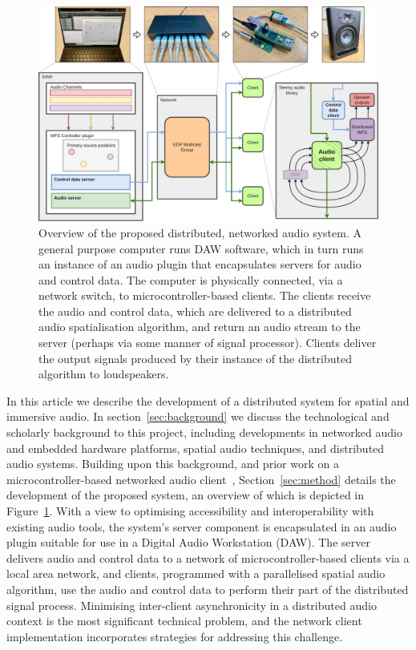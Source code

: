 \documentclass[utf8]{FrontiersinHarvard}
\newcommand{\figref}[1]{Figure~\ref{#1}}
\newcommand{\secref}[1]{section~\ref{#1}}
\newcommand{\Secref}[1]{Section~\ref{#1}}
\begin{document}
    \begin{figure}[ht]
        \centering
        \includegraphics[width=\textwidth]{figures/system_overview}
        \caption{
            Overview of the proposed distributed, networked audio system.
            A general purpose computer runs DAW software, which in turn runs an
            instance of an audio plugin that encapsulates servers for audio and
            control data.
            The computer is physically connected, via a network switch, to
            microcontroller-based clients.
            The clients receive the audio and control data, which are delivered
            to a distributed audio spatialisation algorithm, and return an audio
            stream to the server (perhaps via some manner of signal processor).
            Clients deliver the output signals produced by their instance of the
            distributed algorithm to loudspeakers.
        }
        \label{fig:system-overview}
    \end{figure}

    In this article we describe the development of a distributed system for
    spatial and immersive audio.
    In \secref{sec:background} we discuss the technological and scholarly
    background to this project, including developments in networked audio and
    embedded hardware platforms, spatial audio techniques, and distributed audio
    systems.
    Building upon this background, and prior work on a microcontroller-based
    networked audio client~\citep{rushton_microcontroller-based_2023},
    \Secref{sec:method} details the development of the proposed system, an
    overview of which is depicted in \figref{fig:system-overview}.
    With a view to optimising accessibility and interoperability with existing
    audio tools, the system's server component is encapsulated in an audio
    plugin suitable for use in a Digital Audio Workstation (DAW)\@.
    The server delivers audio and control data to a network of
    microcontroller-based clients via a local area network, and clients,
    programmed with a parallelised spatial audio algorithm, use the audio and
    control data to perform their part of the distributed signal process.
    Minimising inter-client asynchronicity in a distributed audio context is the
    most significant technical problem, and the network client implementation
    incorporates strategies for addressing this challenge.
\end{document}
